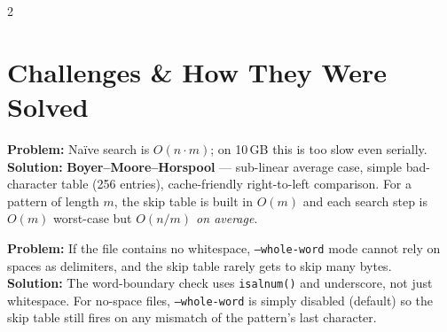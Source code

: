 \documentclass[11pt,a4paper]{article}
\begin{document}
\begin{multicols}{2}
\begin{center}
\end{center}
\end{multicols}

\vspace{0.3cm}
\section{Challenges \& How They Were Solved}

\begin{tcolorbox}[challenge={Challenge 1 — Which string-matching algorithm?}]
\textbf{Problem:} Naïve search is $O(n \cdot m)$; on 10\,GB this is too slow even serially.\\
\textbf{Solution:} \textbf{Boyer–Moore–Horspool} — sub-linear average case, simple bad-character table (256 entries), cache-friendly right-to-left comparison. For a pattern of length $m$, the skip table is built in $O(m)$ and each search step is $O(m)$ worst-case but \emph{$O(n/m)$ on average}.
\end{tcolorbox}

\vspace{0.25cm}

\begin{tcolorbox}[challenge={Challenge 2 — File with no spaces (dense text)}]
\textbf{Problem:} If the file contains no whitespace, \texttt{--whole-word} mode cannot rely on spaces as delimiters, and the skip table rarely gets to skip many bytes.\\
\textbf{Solution:} The word-boundary check uses \texttt{isalnum()} and underscore, not just whitespace.
For no-space files, \texttt{--whole-word} is simply disabled (default) so the skip table still fires on any mismatch of the pattern's last character.
\end{tcolorbox}
\end{document}
